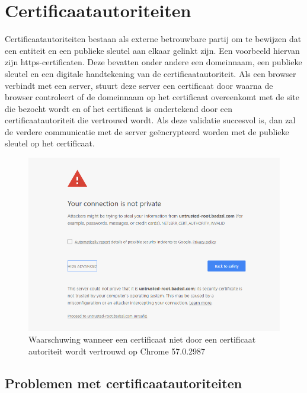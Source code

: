 \chapter{Certificaatautoriteiten}
\label{ch:certificaatautoriteiten}

Certificaatautoriteiten bestaan als externe betrouwbare partij om te bewijzen
dat een entiteit en een publieke sleutel aan elkaar gelinkt zijn. Een voorbeeld
hiervan zijn https-certificaten. Deze bevatten onder andere een domeinnaam, een
publieke sleutel en een digitale handtekening van de certificaatautoriteit. Als
een browser verbindt met een server, stuurt deze server een certificaat door
waarna de browser controleert of de domeinnaam op het certificaat overeenkomt
met de site die bezocht wordt en of het certificaat is ondertekend door een
certificaatautoriteit die vertrouwd wordt. Als deze validatie succesvol is, dan
zal de verdere communicatie met de server geëncrypteerd worden met de publieke
sleutel op het certificaat.

\begin{figure}[H]
	\includegraphics[width=\textwidth,height=\textheight,keepaspectratio]{img/untrusted-root-chrome.png}
	\centering
	\caption{Waarschuwing wanneer een certificaat niet door een certificaat
		autoriteit wordt vertrouwd op Chrome 57.0.2987}
	\label{fig:untrusted-root-chrome}
\end{figure}

\section{Problemen met certificaatautoriteiten}
\label{sec:problemen-met-certificaatautoriteiten}

